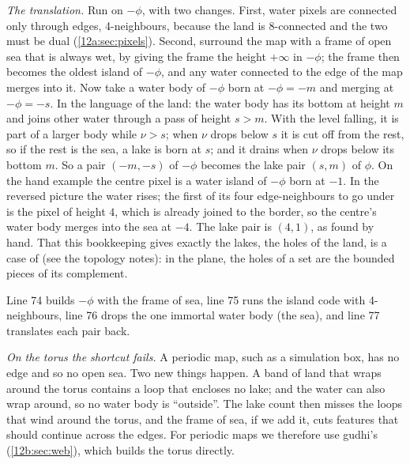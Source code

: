 \emph{The translation.} Run  on $-\phi$, with two changes. First, water pixels are connected only
through edges, 4-neighbours, because the land is 8-connected and the two must be dual (\cref{12a:sec:pixels}).
Second, surround the map with a frame of open sea that is always wet, by giving the frame the height $+\infty$ in
$-\phi$; the frame then becomes the oldest island of $-\phi$, and any water connected to the edge of the map merges
into it. Now take a water body of $-\phi$ born at $-\phi=-m$ and merging at $-\phi=-s$. In the language of the land:
the water body has its bottom at height $m$ and joins other water through a pass of height $s>m$. With the level
falling, it is part of a larger body while $\nu>s$; when $\nu$ drops below $s$ it is cut off from the rest, so if
the rest is the sea, a lake is born at $s$; and it drains when $\nu$ drops below its bottom $m$. So a pair
$(-m,-s)$ of $-\phi$ becomes the lake pair $(s,m)$ of $\phi$. On the hand example the centre pixel is a water
island of $-\phi$ born at $-1$. In the reversed picture the water rises; the first of its four edge-neighbours to
go under is the pixel of height $4$, which is already joined to the border, so the centre's water body merges into
the sea at $-4$. The lake pair is $(4,1)$, as found by hand. That this bookkeeping gives exactly the
lakes, the holes of the land, is a case of  (see the topology notes): in the plane, the
holes of a set are the bounded pieces of its complement.


\noindent Line 74 builds $-\phi$ with the frame of sea, line 75 runs the island code with 4-neighbours, line 76
drops the one immortal water body (the sea), and line 77 translates each pair back.

\emph{On the torus the shortcut fails.} A periodic map, such as a simulation box, has no edge and so no open sea.
Two new things happen. A band of land that wraps around the torus contains a loop that encloses no lake; and the
water can also wrap around, so no water body is ``outside''. The lake count then misses the loops that wind around
the torus, and the frame of sea, if we add it, cuts features that should continue across the edges. For periodic
maps we therefore use gudhi's  (\cref{12b:sec:web}), which builds the torus
directly.

